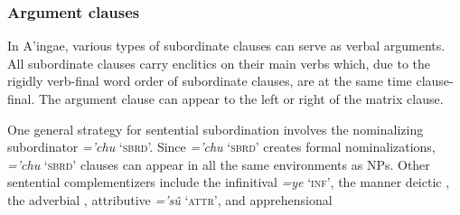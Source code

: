 \documentclass[output=paper,colorlinks,citecolor=brown]{langscibook}
\begin{document}

\subsubsection{Argument clauses}
\label{sec:argumentclauses}

In A'ingae, various types of subordinate clauses can serve as verbal arguments. All subordinate clauses carry enclitics on their main verbs which, due to the rigidly verb-final word order of subordinate clauses, are at the same time clause-final. The argument clause can appear to the left or right of the matrix clause.

{One general strategy for sentential subordination involves the nominalizing subordinator \emph{='chu} `\textsc{sbrd}'. Since \emph{='chu} `\textsc{sbrd}' creates formal nominalizations, \emph{='chu} `\textsc{sbrd}' clauses can appear in all the same environments as NPs. Other sentential complementizers include the infinitival \emph{=ye} `\textsc{inf}', the manner deictic , the adverbial , attributive \emph{='sû} `\textsc{attr}', and apprehensional \sane[.]}
\end{document}

